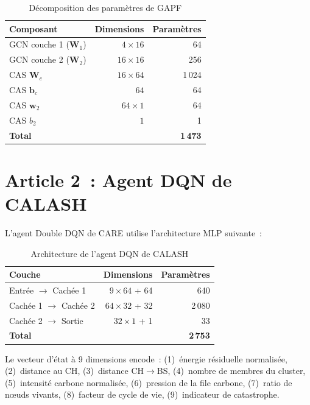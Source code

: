 \begin{table}[htb]
\centering
\caption{Décomposition des paramètres de GAPF}
\label{tab:gapf-params}
\begin{tabular}{lrr}
\toprule
\textbf{Composant} & \textbf{Dimensions} & \textbf{Paramètres} \\
\midrule
GCN couche 1 ($\mathbf{W}_1$) & $4 \times 16$ & 64 \\
GCN couche 2 ($\mathbf{W}_2$) & $16 \times 16$ & 256 \\
CAS $\mathbf{W}_c$ & $16 \times 64$ & 1\,024 \\
CAS $\mathbf{b}_c$ & $64$ & 64 \\
CAS $\mathbf{w}_2$ & $64 \times 1$ & 64 \\
CAS $b_2$ & $1$ & 1 \\
\midrule
\textbf{Total} & & \textbf{1\,473} \\
\bottomrule
\end{tabular}
\end{table}

\section*{Article 2~: Agent DQN de CALASH}

L'agent Double DQN de CARE utilise l'architecture MLP suivante~:

\begin{table}[htb]
\centering
\caption{Architecture de l'agent DQN de CALASH}
\label{tab:calash-dqn}
\begin{tabular}{lrr}
\toprule
\textbf{Couche} & \textbf{Dimensions} & \textbf{Paramètres} \\
\midrule
Entrée $\to$ Cachée 1 & $9 \times 64$ + 64 & 640 \\
Cachée 1 $\to$ Cachée 2 & $64 \times 32$ + 32 & 2\,080 \\
Cachée 2 $\to$ Sortie & $32 \times 1$ + 1 & 33 \\
\midrule
\textbf{Total} & & \textbf{2\,753} \\
\bottomrule
\end{tabular}
\end{table}

Le vecteur d'état à 9 dimensions encode~: (1)~énergie résiduelle normalisée, (2)~distance au CH, (3)~distance CH$\to$BS, (4)~nombre de membres du cluster, (5)~intensité carbone normalisée, (6)~pression de la file carbone, (7)~ratio de n\oe{}uds vivants, (8)~facteur de cycle de vie, (9)~indicateur de catastrophe.

